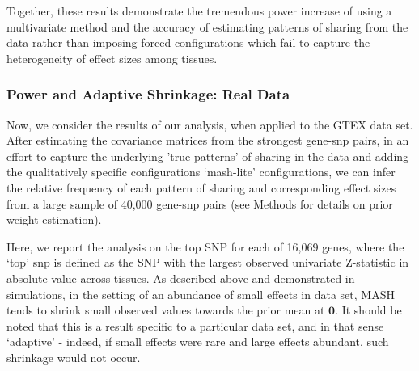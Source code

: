 Together, these results demonstrate the tremendous power increase of using a multivariate method and the accuracy of estimating patterns of sharing from the data rather than imposing forced configurations which fail to capture the heterogeneity of effect sizes among tissues.


\subsubsection{Power and Adaptive Shrinkage: Real Data}

Now, we consider the results of our analysis, when applied to the GTEX data set. After estimating the covariance matrices from the strongest gene-snp pairs, in an effort to capture the underlying 'true patterns' of sharing in the data and adding the qualitatively specific configurations `mash-lite' configurations, we can infer the relative frequency of each pattern of sharing and corresponding effect sizes from a large sample of 40,000 gene-snp pairs (see Methods for details on prior weight estimation).

Here, we report the analysis on the top SNP for each of 16,069 genes, where the `top' snp is defined as the SNP with the largest observed univariate Z-statistic in absolute value across tissues. As described above and demonstrated in simulations, in the setting of an abundance of small effects in data set, MASH tends to shrink small observed values towards the prior mean at $\bm{0}$. It should be noted that this is a result specific to a particular data set, and in that sense `adaptive' - indeed, if small effects were rare and large effects abundant, such shrinkage would not occur. 

